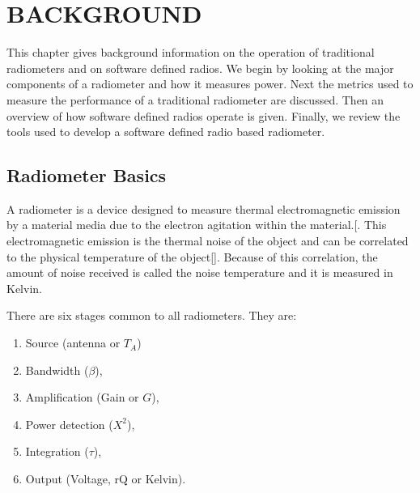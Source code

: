 
\chapter{BACKGROUND}\label{ch:background}
This chapter gives background information on the operation of  traditional radiometers and on software defined radios.  We begin by looking at the major components of a radiometer and how it measures power.  Next the metrics used to measure the performance of a traditional radiometer are discussed.  Then an overview of how software defined radios operate is given.  Finally, we review the tools used to develop a software defined radio based radiometer.  

\section{Radiometer Basics}\label{rad_basics}
A radiometer is a device designed to measure thermal electromagnetic emission by a material media due to the electron agitation within the material.[\cite{ulaby}.  This electromagnetic emission is the thermal noise of the object and can be correlated to the physical temperature of the object[\cite{Nyquist1928thermal}].  Because of this correlation, the amount of noise received is called the noise temperature and it is measured in Kelvin. 

There are six stages common to all radiometers.  They are:

\begin{enumerate}
\item Source (antenna or $T_{A}$)
\item Bandwidth ($\beta$),
\item Amplification (Gain or $G$),
\item Power detection ($X^{2}$),
\item Integration ($\tau$),
\item Output (Voltage, rQ or Kelvin).
\end{enumerate}


